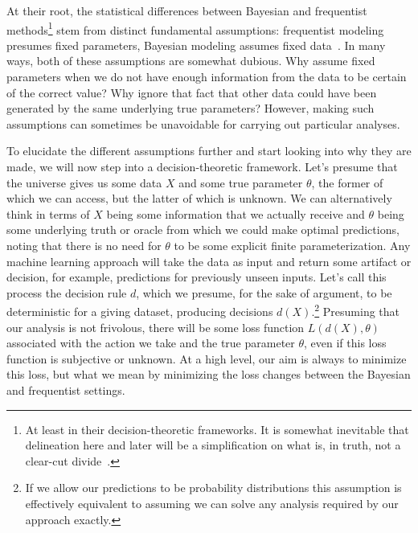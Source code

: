 At their root, the statistical differences between Bayesian and frequentist methods\footnote{At least in their decision-theoretic
frameworks.  It is somewhat inevitable that delineation here and later will be a simplification on what is, in truth, not a 
clear-cut divide~\citep{gelman2011induction}.}
stem from distinct fundamental
assumptions: frequentist modeling presumes fixed parameters, Bayesian modeling assumes fixed data~\citep{jordan2009you}.  In many ways,
both of these assumptions are somewhat dubious. Why assume fixed parameters when we do not have enough
information from the data to be certain of the correct value?  Why ignore that fact that other data could have 
been generated by the same underlying true parameters?  However,
making such assumptions can sometimes be unavoidable for carrying out particular analyses.

To elucidate the
different assumptions further and start looking into why they are made, we will now step into a decision-theoretic
framework.  Let's presume that the universe gives us some data $X$ and some true parameter $\theta$, the former of which
we can access, but the latter of which is unknown.  We can alternatively think in terms of $X$ being some information
that we actually receive and $\theta$ being some underlying truth or oracle from which we could make optimal predictions, noting 
that there is
no need for $\theta$ to be some explicit finite parameterization.  Any machine learning approach will take the data as input and
return some artifact or decision, for example, predictions for previously unseen inputs.  
Let's call this process the decision rule $d$, which we presume, for the sake of argument, to be 
deterministic for a giving dataset, producing decisions $d(X)$.\footnote{If we allow our predictions to be probability
distributions this assumption is effectively equivalent to assuming we can solve any analysis required by our approach exactly.}
Presuming that our analysis is not frivolous, there will be some loss function $L(d(X),\theta)$ associated with the action we take
and the true parameter $\theta$, even if this loss function is subjective or unknown.  At a high level, our aim is always to
minimize this loss, but what we mean by minimizing the loss changes between the Bayesian and frequentist settings.  

